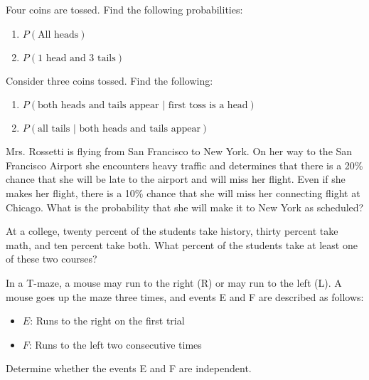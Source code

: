 \begin{puzzle}
    Four coins are tossed. Find the following probabilities:
    \begin{enumerate}
        \item \( P(\text{All heads}) \)
        \item \( P(\text{1 head and 3 tails}) \)
    \end{enumerate}
\end{puzzle}

\begin{puzzle}
    Consider three coins tossed. Find the following:
    \begin{enumerate}
        \item \( P(\text{both heads and tails appear } | \text{ first toss is a head}) \)
        \item \( P(\text{all tails } | \text{ both heads and tails appear}) \)
    \end{enumerate}
\end{puzzle}

\begin{puzzle}
    Mrs. Rossetti is flying from San Francisco to New York. On her way to the San Francisco Airport she encounters heavy traffic and determines that there is a 20\% chance that she will be late to the airport and will miss her flight. Even if she makes her flight, there is a 10\% chance that she will miss her connecting flight at Chicago. What is the probability that she will make it to New York as scheduled?
\end{puzzle}

\begin{puzzle}
    At a college, twenty percent of the students take history, thirty percent take math, and ten percent take both. What percent of the students take at least one of these two courses?
\end{puzzle}

\begin{puzzle}
    In a T-maze, a mouse may run to the right (R) or may run to the left (L). A mouse goes up the maze three times, and events E and F are described as follows:
    \begin{itemize}
        \item \( E \): Runs to the right on the first trial
        \item \( F \): Runs to the left two consecutive times
    \end{itemize}
    Determine whether the events E and F are independent.
\end{puzzle}

